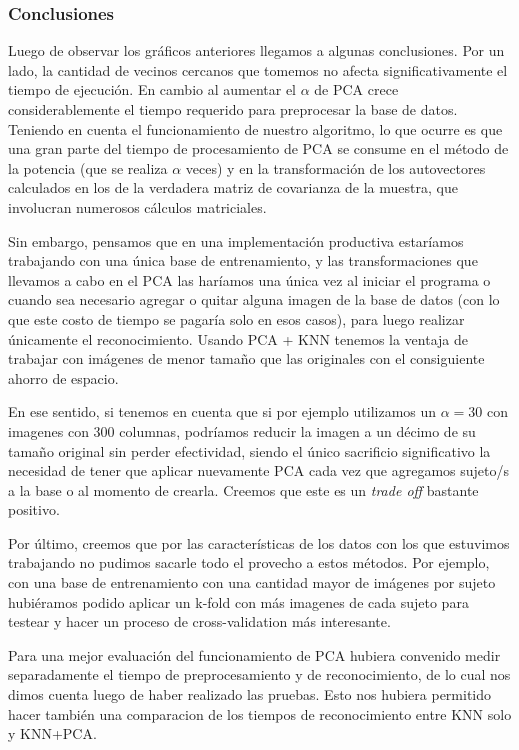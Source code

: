 \subsubsection*{Conclusiones}


Luego de observar los gráficos anteriores llegamos a algunas conclusiones.
Por un lado, la cantidad de vecinos cercanos que tomemos no afecta significativamente el tiempo de ejecución. En cambio al aumentar el $\alpha$ de PCA crece considerablemente el tiempo requerido para preprocesar la base de datos.
Teniendo en cuenta el funcionamiento de nuestro algoritmo, lo que ocurre es que una gran parte del tiempo de procesamiento de PCA se consume en el método de la potencia (que se realiza $\alpha$ veces) y en la transformación de los autovectores calculados en los de la verdadera matriz de covarianza de la muestra, que involucran numerosos cálculos matriciales.\newline

Sin embargo, pensamos que en una implementación productiva estaríamos trabajando con una única base de entrenamiento, y las transformaciones que llevamos a cabo en el PCA las haríamos una única vez al iniciar el programa o cuando sea necesario agregar o quitar alguna imagen de la base de datos (con lo que este costo de tiempo se pagaría solo en esos casos), para luego realizar únicamente el reconocimiento. Usando PCA + KNN tenemos la ventaja de trabajar con imágenes de menor tamaño que las originales con el consiguiente ahorro de espacio.

En ese sentido, si tenemos en cuenta que si por ejemplo utilizamos un $\alpha = 30$ con imagenes con 300 columnas, podríamos reducir la imagen a un décimo de su tamaño original sin perder efectividad, siendo el único sacrificio significativo la necesidad de tener que aplicar nuevamente PCA cada vez que agregamos sujeto/s a la base o al momento de crearla. Creemos que este es un \textit{trade off} bastante positivo.\newline
 
Por último, creemos que por las características de los datos con los que estuvimos trabajando no pudimos sacarle todo el provecho a estos métodos. Por ejemplo, con una base de entrenamiento con una cantidad mayor de imágenes por sujeto hubiéramos podido aplicar un k-fold con más imagenes de cada sujeto para testear y hacer un proceso de cross-validation más interesante.

\par Para una mejor evaluación del funcionamiento de PCA hubiera convenido medir separadamente el tiempo de preprocesamiento y de reconocimiento, de lo cual nos dimos cuenta luego de haber realizado las pruebas. Esto nos hubiera permitido hacer también una comparacion de los tiempos de reconocimiento entre KNN solo y KNN+PCA.